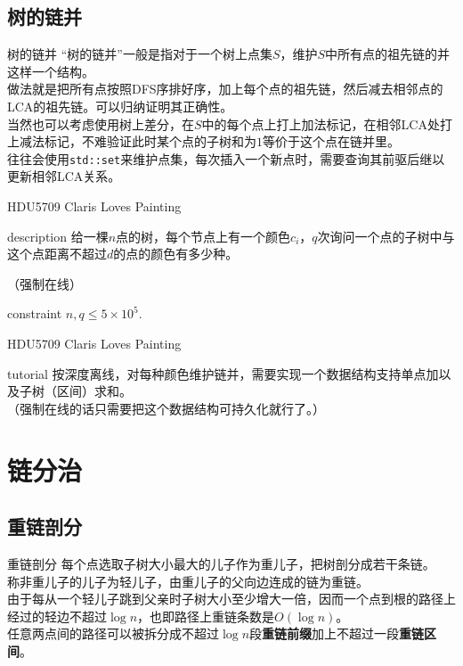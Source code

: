 \documentclass{beamer}
\begin{document}
\subsection{树的链并}
\begin{frame}{树的链并}
	“树的链并”一般是指对于一个树上点集$S$，维护$S$中所有点的祖先链的并这样一个结构。\\
	
	做法就是把所有点按照DFS序排好序，加上每个点的祖先链，然后减去相邻点的LCA的祖先链。可以归纳证明其正确性。\\
	
	当然也可以考虑使用树上差分，在$S$中的每个点上打上加法标记，在相邻LCA处打上减法标记，不难验证此时某个点的子树和为$1$等价于这个点在链并里。\\
	
	往往会使用\texttt{std::set}来维护点集，每次插入一个新点时，需要查询其前驱后继以更新相邻LCA关系。
\end{frame}

\begin{frame}{HDU5709 Claris Loves Painting}
	\begin{block}{description}
		给一棵$n$点的树，每个节点上有一个颜色$c_i$，$q$次询问一个点的子树中与这个点距离不超过$d$的点的颜色有多少种。
		
		（强制在线）
	\end{block}
	\begin{block}{constraint}
		$n, q \le 5 \times 10^5.$
	\end{block}
\end{frame}
\begin{frame}{HDU5709 Claris Loves Painting}
	\begin{block}{tutorial}
		按深度离线，对每种颜色维护链并，需要实现一个数据结构支持单点加以及子树（区间）求和。\\
		
		（强制在线的话只需要把这个数据结构可持久化就行了。）
	\end{block}
\end{frame}

\section{链分治}
\subsection{重链剖分}
\begin{frame}{重链剖分}
	每个点选取子树大小最大的儿子作为重儿子，把树剖分成若干条链。\\
	
	称非重儿子的儿子为轻儿子，由重儿子的父向边连成的链为重链。\\
	
	由于每从一个轻儿子跳到父亲时子树大小至少增大一倍，因而一个点到根的路径上经过的轻边不超过$\log n$，也即路径上重链条数是$O(\log n)$。\\
	
	任意两点间的路径可以被拆分成不超过$\log n$段\textbf{重链前缀}加上不超过一段\textbf{重链区间}。
\end{frame}
\end{document}

